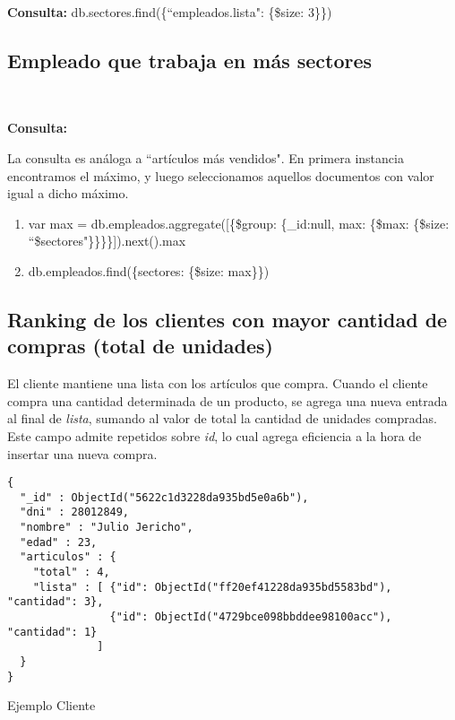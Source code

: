 \textbf{Consulta: } db.sectores.find(\{``empleados.lista": \{\$size: 3\}\})

\vspace{3em}

\subsection{Empleado que trabaja en más sectores}

\

\textbf{Consulta: }

La consulta es análoga a ``artículos más vendidos". En primera instancia encontramos el máximo, y luego
seleccionamos aquellos documentos con valor igual a dicho máximo.

\begin{enumerate}
  \item var max = db.empleados.aggregate([\{\$group: \{\_id:null, max: \{\$max: \{\$size: ``\$sectores"\}\}\}\}]).next().max
  \item db.empleados.find(\{sectores: \{\$size: max\}\})
\end{enumerate}

\vspace{3em}

\subsection{Ranking de los clientes con mayor cantidad de compras (total de unidades)}

El cliente mantiene una lista con los artículos que compra.
Cuando el cliente compra una cantidad determinada de un producto, se agrega una nueva entrada al
final de \emph{lista}, sumando al valor de total la cantidad de unidades compradas. Este campo
admite repetidos sobre \emph{id}, lo cual agrega eficiencia a la hora de insertar una nueva compra.

\vspace{3em}

\begin{listing}
\begin{verbatim}
{
  "_id" : ObjectId("5622c1d3228da935bd5e0a6b"),
  "dni" : 28012849,
  "nombre" : "Julio Jericho",
  "edad" : 23,
  "articulos" : {
    "total" : 4,
    "lista" : [ {"id": ObjectId("ff20ef41228da935bd5583bd"), "cantidad": 3},
                {"id": ObjectId("4729bce098bbddee98100acc"), "cantidad": 1}
              ]
  }
}

\end{verbatim}
\caption{Ejemplo Cliente}
\label{json-example}
\end{listing}

